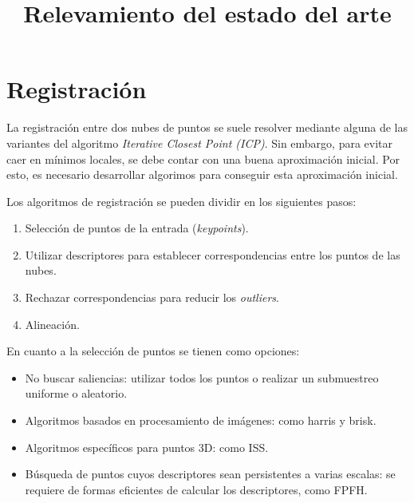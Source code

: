 \documentclass{pfc}
\title{Relevamiento del estado del arte}
\begin{document}
	\maketitle


	\section{Registración}
		La registración entre dos nubes de puntos se suele resolver mediante
		alguna de las variantes del algoritmo \emph{Iterative Closest Point (ICP)}. 
		Sin embargo, para evitar caer en mínimos locales,
		se debe contar con una buena aproximación inicial.
		Por esto, es necesario desarrollar algorimos para conseguir esta
		aproximación inicial.\cite{7271006}



		Los algoritmos de registración se pueden dividir en los siguientes pasos:
		\begin{enumerate}
			\item Selección de puntos de la entrada (\emph{keypoints}).
			\item Utilizar descriptores para establecer correspondencias entre los puntos de las nubes.
			\item Rechazar correspondencias para reducir los \emph{outliers}.
			\item Alineación.\cite{conf/3dim/RusinkiewiczL01}
		\end{enumerate}

		En cuanto a la selección de puntos se tienen como opciones:
		\begin{itemize}
			\item No buscar saliencias: utilizar todos los puntos o realizar un submuestreo uniforme o aleatorio.
			\item Algoritmos basados en procesamiento de imágenes: como harris y brisk.
			\item Algoritmos específicos para puntos 3D: como ISS.
			\item Búsqueda de puntos cuyos descriptores sean persistentes a varias escalas: se requiere de formas eficientes de calcular los descriptores, como FPFH.
		\end{itemize}
\end{document}
